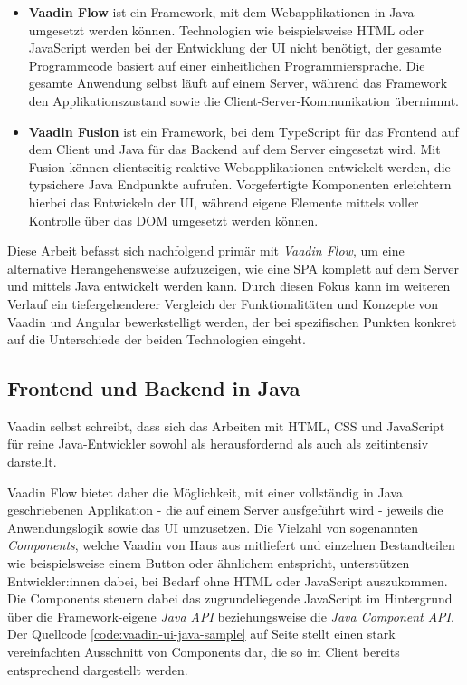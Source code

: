 \documentclass[a4paper,12pt,twoside]{scrreprt}
\begin{document}
\begin{itemize}
    \item \textbf{Vaadin Flow} ist ein Framework, mit dem Webapplikationen in Java umgesetzt werden können. Technologien wie beispielsweise HTML oder JavaScript werden bei der Entwicklung der \acs{UI} nicht benötigt, der gesamte Programmcode basiert auf einer einheitlichen Programmiersprache. Die gesamte Anwendung selbst läuft auf einem Server, während das Framework den Applikationszustand sowie die Client-Server-Kommunikation übernimmt. \parencite[][]{vaadin_ltd_vaadin_nodate}
    \item \textbf{Vaadin Fusion} ist ein Framework, bei dem TypeScript für das Frontend auf dem Client und Java für das Backend auf dem Server eingesetzt wird. Mit Fusion können clientseitig reaktive Webapplikationen entwickelt werden, die typsichere Java Endpunkte aufrufen. Vorgefertigte Komponenten erleichtern hierbei das Entwickeln der \acs{UI}, während eigene Elemente mittels voller Kontrolle über das \ac{DOM} umgesetzt werden können. \parencite[][]{vaadin_ltd_vaadin_nodate-1}
\end{itemize}

Diese Arbeit befasst sich nachfolgend primär mit \textit{Vaadin Flow}, um eine alternative Herangehensweise aufzuzeigen, wie eine \ac{SPA} komplett auf dem Server und mittels Java entwickelt werden kann. Durch diesen Fokus kann im weiteren Verlauf ein tiefergehenderer Vergleich der Funktionalitäten und Konzepte von Vaadin und Angular bewerkstelligt werden, der bei spezifischen Punkten konkret auf die Unterschiede der beiden Technologien eingeht.

\subsection{Frontend und Backend in Java}
\label{sub-sec:frontend-backend-java}
Vaadin selbst schreibt, dass sich das Arbeiten mit HTML, \ac{CSS} und JavaScript für reine Java-Entwickler sowohl als herausfordernd als auch als zeitintensiv darstellt. \parencite[][Framework - Introduction - Overview]{vaadin_ltd_documentation_nodate}

Vaadin Flow bietet daher die Möglichkeit, mit einer vollständig in Java geschriebenen Applikation - die auf einem Server ausfgeführt wird - jeweils die Anwendungslogik sowie das \acl{UI} umzusetzen. Die Vielzahl von sogenannten \textit{Components}, welche Vaadin von Haus aus mitliefert und einzelnen Bestandteilen wie beispielsweise einem Button oder ähnlichem entspricht, unterstützen Entwickler:innen dabei, bei Bedarf ohne HTML oder JavaScript auszukommen. Die Components steuern dabei das zugrundeliegende JavaScript im Hintergrund über die Framework-eigene \textit{Java API} beziehungsweise die \textit{Java Component API}. Der Quellcode \ref{code:vaadin-ui-java-sample} auf Seite \pageref{code:vaadin-ui-java-sample} stellt einen stark vereinfachten Ausschnitt von Components dar, die so im Client bereits entsprechend dargestellt werden. \parencite[][Framework - Introduction - Overview]{vaadin_ltd_documentation_nodate}
\end{document}
